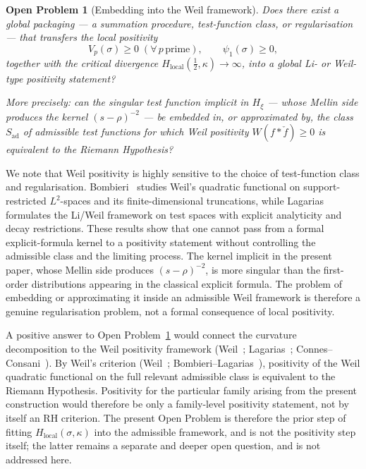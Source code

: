 \documentclass[11pt]{article}
\newtheorem{openproblem}[theorem]{Open Problem}
\newcommand{\Hxi}{H_{\xi}}
\newcommand{\Hlocal}{H_{\mathrm{local}}}
\newcommand{\Sad}{S_{\mathrm{ad}}}
\begin{document}
\begin{openproblem}[Embedding into the Weil framework]\label{op:weil-embedding}
Does there exist a global packaging --- a summation
procedure, test-function class, or regularisation --- that
transfers the local positivity
\[
V_p(\sigma)\ge 0\;(\forall\,p\,\text{prime}),
\qquad
\psi_1(\sigma)\ge 0,
\]
together with the critical divergence
$\Hlocal(\tfrac12,\kappa)\to\infty$, into a global
Li- or Weil-type positivity statement?

More precisely: can the singular test function implicit in
$\Hxi$ --- whose Mellin side produces the kernel
$(s-\rho)^{-2}$ --- be embedded in, or approximated by, the
class $\Sad$ of admissible test functions for which Weil
positivity $W(f*\check f)\ge 0$ is equivalent to the Riemann
Hypothesis?
\end{openproblem}

We note that Weil positivity is highly sensitive to the
choice of test-function class and regularisation.
Bombieri~\cite{Bombieri2000} studies Weil's quadratic
functional on support-restricted $L^2$-spaces and its
finite-dimensional truncations, while
Lagarias~\cite{Lagarias2007} formulates the Li/Weil
framework on test spaces with explicit analyticity and
decay restrictions. These results show that one cannot
pass from a formal explicit-formula kernel to a positivity
statement without controlling the admissible class and
the limiting process. The kernel implicit in the present
paper, whose Mellin side produces $(s-\rho)^{-2}$, is more
singular than the first-order distributions appearing in
the classical explicit formula. The problem of embedding
or approximating it inside an admissible Weil framework
is therefore a genuine regularisation problem, not a
formal consequence of local positivity.

A positive answer to Open Problem~\ref{op:weil-embedding}
would connect the curvature decomposition to the Weil
positivity framework
(Weil~\cite{Weil1952}; Lagarias~\cite{Lagarias};
Connes--Consani~\cite{ConnesConsani}).
By Weil's criterion
(Weil~\cite{Weil1952}; Bombieri--Lagarias~\cite{BombieriLagarias}),
positivity of the Weil quadratic functional on the full relevant
admissible class is equivalent to the Riemann Hypothesis.
Positivity for the particular family arising from the present
construction would therefore be only a family-level positivity
statement, not by itself an RH criterion.
The present Open Problem is therefore the prior step of
fitting $\Hlocal(\sigma,\kappa)$ into the admissible
framework, and is not the positivity step itself; the latter
remains a separate and deeper open question, and is not
addressed here.
\end{document}
